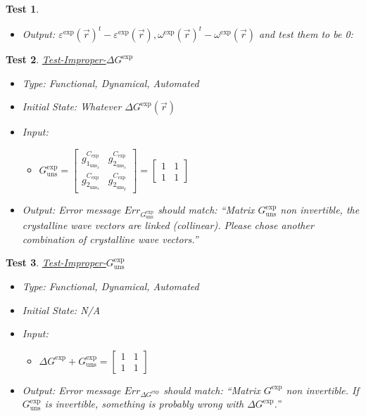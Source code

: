 \documentclass[12pt, titlepage]{article}
\newtheorem{Test}{Test}
\begin{document}
\begin{Test}
\begin{itemize}
\item Output:  ${\varepsilon^{\text{exp}}(\vec{r})}^{t}-\varepsilon^{\text{exp}}(\vec{r}), {\omega^{\text{exp}}(\vec{r})}^{t}- \omega^{\text{exp}}(\vec{r})$  and test them to be 0:
\end{itemize}
\end{Test}

\begin{Test}\normalfont\underline{Test-Improper-$\Delta G^{\text{exp}}$}
\label{T_Bad-G_ref}
\begin{itemize}
\item Type: Functional, Dynamical, Automated
\item Initial State: Whatever $\Delta G^{\text{exp}}(\vec{r})$
\item Input:
\begin{itemize}
	\item $G_{\text{uns}}^{\text{exp}} =
	\begin{bmatrix}
	g_{1_{{\text{uns}}_x}}^{C_{\text{exp}}} & g_{2_{{\text{uns}}_x}}^{C_{\text{exp}}} \\
	g_{2_{{\text{uns}}_x}}^{C_{\text{exp}}} & g_{2_{{\text{uns}}_y}}^{C_{\text{exp}}} 
	\end{bmatrix} =\begin{bmatrix}
	1 & 1 \\
	1 & 1 
	\end{bmatrix} $
	\end{itemize} 
\item Output:
Error message $Err_{G_{\text{uns}}^{\text{exp}}}$ should match: \enquote{Matrix $G_{\text{uns}}^{\text{exp}}$ non invertible, the crystalline wave vectors are linked (collinear). Please chose another combination of crystalline wave vectors.}
\end{itemize}
\end{Test}

\begin{Test}\normalfont\underline{Test-Improper-$G_{\text{uns}}^{\text{exp}}$}
\label{T_Bad-Delta-G}
\begin{itemize}
\item Type: Functional, Dynamical, Automated
\item Initial State: N/A
\item Input:
\begin{itemize}
	\item $\Delta G^{\text{exp}}+G_{\text{uns}}^{\text{exp}} =
	\begin{bmatrix}
	1 & 1 \\
	1 & 1 
	\end{bmatrix} $
	\end{itemize} 
\item Output:
Error message $Err_{\Delta G^{\text{exp}}}$ should match: \enquote{Matrix $G^{\text{exp}}$ non invertible. If  $G_{\text{uns}}^{\text{exp}}$ is invertible, something is probably wrong with $\Delta G^{\text{exp}}$.}
\end{itemize}
\end{Test}
\end{document}
